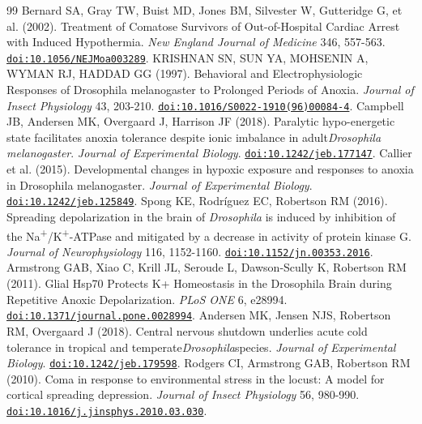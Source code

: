 \documentclass[11pt]{article}
\begin{document}
\begin{thebibliography}{99}
 Bernard SA, Gray TW, Buist MD, Jones BM, Silvester W, Gutteridge G, et al. (2002). Treatment of Comatose Survivors of Out-of-Hospital Cardiac Arrest with Induced Hypothermia. \emph{New England Journal of Medicine} 346, 557-563. \href{https://doi.org/10.1056/NEJMoa003289}{\nolinkurl{doi:10.1056/NEJMoa003289}}.
 KRISHNAN SN, SUN YA, MOHSENIN A, WYMAN RJ, HADDAD GG (1997). Behavioral and Electrophysiologic Responses of Drosophila melanogaster to Prolonged Periods of Anoxia. \emph{Journal of Insect Physiology} 43, 203-210. \href{https://doi.org/10.1016/S0022-1910(96)00084-4}{\nolinkurl{doi:10.1016/S0022-1910(96)00084-4}}.
 Campbell JB, Andersen MK, Overgaard J, Harrison JF (2018). Paralytic hypo-energetic state facilitates anoxia tolerance despite ionic imbalance in adult\emph{Drosophila melanogaster}. \emph{Journal of Experimental Biology}. \href{https://doi.org/10.1242/jeb.177147}{\nolinkurl{doi:10.1242/jeb.177147}}.
 Callier et al. (2015). Developmental changes in hypoxic exposure and responses to anoxia in Drosophila melanogaster. \emph{Journal of Experimental Biology}. \href{https://doi.org/10.1242/jeb.125849}{\nolinkurl{doi:10.1242/jeb.125849}}.
 Spong KE, Rodríguez EC, Robertson RM (2016). Spreading depolarization in the brain of \emph{Drosophila} is induced by inhibition of the Na\textsuperscript{+}/K\textsuperscript{+}-ATPase and mitigated by a decrease in activity of protein kinase G. \emph{Journal of Neurophysiology} 116, 1152-1160. \href{https://doi.org/10.1152/jn.00353.2016}{\nolinkurl{doi:10.1152/jn.00353.2016}}.
 Armstrong GAB, Xiao C, Krill JL, Seroude L, Dawson-Scully K, Robertson RM (2011). Glial Hsp70 Protects K+ Homeostasis in the Drosophila Brain during Repetitive Anoxic Depolarization. \emph{PLoS ONE} 6, e28994. \href{https://doi.org/10.1371/journal.pone.0028994}{\nolinkurl{doi:10.1371/journal.pone.0028994}}.
 Andersen MK, Jensen NJS, Robertson RM, Overgaard J (2018). Central nervous shutdown underlies acute cold tolerance in tropical and temperate\emph{Drosophila}species. \emph{Journal of Experimental Biology}. \href{https://doi.org/10.1242/jeb.179598}{\nolinkurl{doi:10.1242/jeb.179598}}.
 Rodgers CI, Armstrong GAB, Robertson RM (2010). Coma in response to environmental stress in the locust: A model for cortical spreading depression. \emph{Journal of Insect Physiology} 56, 980-990. \href{https://doi.org/10.1016/j.jinsphys.2010.03.030}{\nolinkurl{doi:10.1016/j.jinsphys.2010.03.030}}.

\end{thebibliography}
\end{document}
